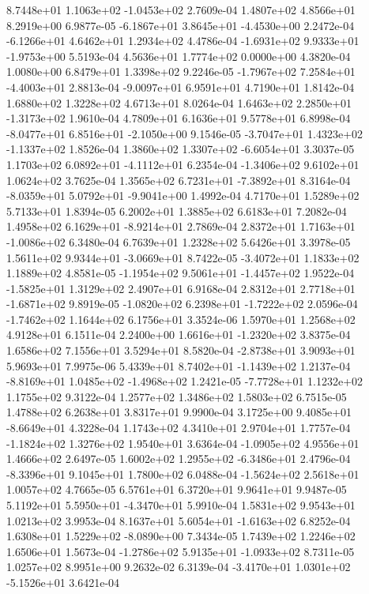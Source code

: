  8.7448e+01  1.1063e+02 -1.0453e+02  2.7609e-04
1.4807e+02 4.8566e+01 8.2919e+00  6.9877e-05
-6.1867e+01  3.8645e+01 -4.4530e+00  2.2472e-04
-6.1266e+01  4.6462e+01  1.2934e+02  4.4786e-04
-1.6931e+02  9.9333e+01 -1.9753e+00  5.5193e-04
4.5636e+01 1.7774e+02 0.0000e+00  4.3820e-04
1.0080e+00 6.8479e+01 1.3398e+02  9.2246e-05
-1.7967e+02  7.2584e+01 -4.4003e+01  2.8813e-04
-9.0097e+01  6.9591e+01  4.7190e+01  1.8142e-04
1.6880e+02 1.3228e+02 4.6713e+01  8.0264e-04
 1.6463e+02  2.2850e+01 -1.3173e+02  1.9610e-04
4.7809e+01 6.1636e+01 9.5778e+01  6.8998e-04
-8.0477e+01  6.8516e+01 -2.1050e+00  9.1546e-05
-3.7047e+01  1.4323e+02 -1.1337e+02  1.8526e-04
 1.3860e+02  1.3307e+02 -6.6054e+01  3.3037e-05
 1.1703e+02  6.0892e+01 -4.1112e+01  6.2354e-04
-1.3406e+02  9.6102e+01  1.0624e+02  3.7625e-04
 1.3565e+02  6.7231e+01 -7.3892e+01  8.3164e-04
-8.0359e+01  5.0792e+01 -9.9041e+00  1.4992e-04
4.7170e+01 1.5289e+02 5.7133e+01  1.8394e-05
6.2002e+01 1.3885e+02 6.6183e+01  7.2082e-04
 1.4958e+02  6.1629e+01 -8.9214e+01  2.7869e-04
 2.8372e+01  1.7163e+01 -1.0086e+02  6.3480e-04
6.7639e+01 1.2328e+02 5.6426e+01  3.3978e-05
 1.5611e+02  9.9344e+01 -3.0669e+01  8.7422e-05
-3.4072e+01  1.1833e+02  1.1889e+02  4.8581e-05
-1.1954e+02  9.5061e+01 -1.4457e+02  1.9522e-04
-1.5825e+01  1.3129e+02  2.4907e+01  6.9168e-04
 2.8312e+01  2.7718e+01 -1.6871e+02  9.8919e-05
-1.0820e+02  6.2398e+01 -1.7222e+02  2.0596e-04
-1.7462e+02  1.1644e+02  6.1756e+01  3.3524e-06
1.5970e+01 1.2568e+02 4.9128e+01  6.1511e-04
 2.2400e+00  1.6616e+01 -1.2320e+02  3.8375e-04
1.6586e+02 7.1556e+01 3.5294e+01  8.5820e-04
-2.8738e+01  3.9093e+01  5.9693e+01  7.9975e-06
 5.4339e+01  8.7402e+01 -1.1439e+02  1.2137e-04
-8.8169e+01  1.0485e+02 -1.4968e+02  1.2421e-05
-7.7728e+01  1.1232e+02  1.1755e+02  9.3122e-04
1.2577e+02 1.3486e+02 1.5803e+02  6.7515e-05
1.4788e+02 6.2638e+01 3.8317e+01  9.9900e-04
 3.1725e+00  9.4085e+01 -8.6649e+01  4.3228e-04
1.1743e+02 4.3410e+01 2.9704e+01  1.7757e-04
-1.1824e+02  1.3276e+02  1.9540e+01  3.6364e-04
-1.0905e+02  4.9556e+01  1.4666e+02  2.6497e-05
 1.6002e+02  1.2955e+02 -6.3486e+01  2.4796e-04
-8.3396e+01  9.1045e+01  1.7800e+02  6.0488e-04
-1.5624e+02  2.5618e+01  1.0057e+02  4.7665e-05
6.5761e+01 6.3720e+01 9.9641e+01  9.9487e-05
 5.1192e+01  5.5950e+01 -4.3470e+01  5.9910e-04
1.5831e+02 9.9543e+01 1.0213e+02  3.9953e-04
 8.1637e+01  5.6054e+01 -1.6163e+02  6.8252e-04
 1.6308e+01  1.5229e+02 -8.0890e+00  7.3434e-05
1.7439e+02 1.2246e+02 1.6506e+01  1.5673e-04
-1.2786e+02  5.9135e+01 -1.0933e+02  8.7311e-05
1.0257e+02 8.9951e+00 9.2632e-02  6.3139e-04
-3.4170e+01  1.0301e+02 -5.1526e+01  3.6421e-04
